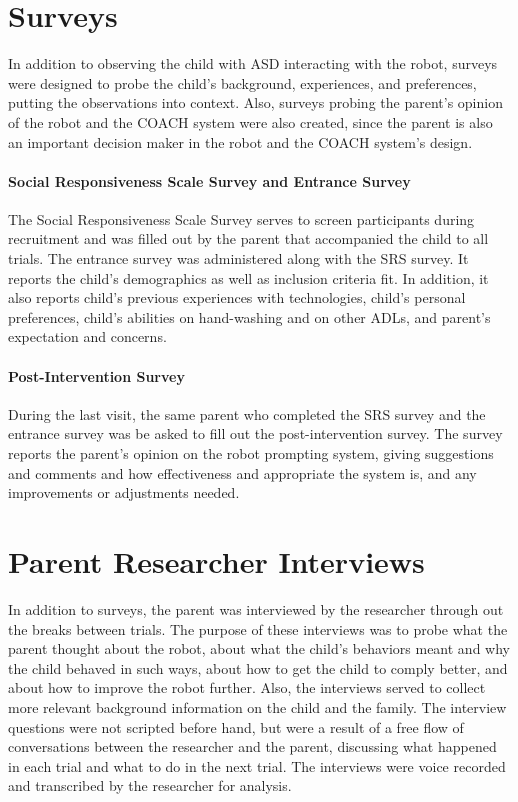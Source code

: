 \documentclass{ut-thesis}
\begin{document}
\section{Surveys}
In addition to observing the child with ASD interacting with the robot, surveys were designed to probe the child's background, experiences, and preferences, putting the observations into context.  Also, surveys probing the parent's opinion of the robot and the COACH system were also created, since the parent is also an important decision maker in the robot and the COACH system's design.

\paragraph{Social Responsiveness Scale Survey and Entrance Survey}
The Social Responsiveness Scale Survey \cite{constantino2002social} serves to screen participants during recruitment and was filled out by the parent that accompanied the child to all trials.  The entrance survey was administered along with the SRS survey.  It reports the child's demographics as well as inclusion criteria fit.  In addition, it also reports child's previous experiences with technologies, child's personal preferences, child's abilities on hand-washing and on other ADLs, and parent's expectation and concerns.

\paragraph{Post-Intervention Survey}
During the last visit, the same parent who completed the SRS survey and the entrance survey was be asked to fill out the post-intervention survey.  The survey reports the parent's opinion on the robot prompting system, giving suggestions and comments and how effectiveness and appropriate the system is, and any improvements or adjustments needed.

\section{Parent Researcher Interviews}
In addition to surveys, the parent was interviewed by the researcher through out the breaks between trials.  The purpose of these interviews was to probe what the parent thought about the robot, about what the child's behaviors meant and why the child behaved in such ways, about how to get the child to comply better, and about how to improve the robot further.  Also, the interviews served to collect more relevant background information on the child and the family.  The interview questions were not scripted before hand, but were a result of a free flow of conversations between the researcher and the parent, discussing what happened in each trial and what to do in the next trial.  The interviews were voice recorded and transcribed by the researcher for analysis.
\end{document}
